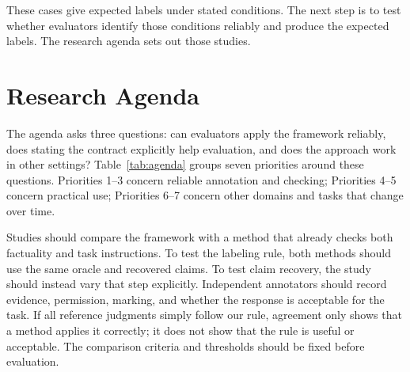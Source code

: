 \documentclass{clv2025}
\begin{document}
These cases give expected labels under stated conditions. The next step is
to test whether evaluators identify those conditions reliably and produce
the expected labels. The research agenda sets out those studies.


\section{Research Agenda}\label{sec:agenda}

The agenda asks three questions: can evaluators apply the framework reliably,
does stating the contract explicitly help evaluation, and does the approach
work in other settings? Table~\ref{tab:agenda} groups seven priorities around
these questions. Priorities 1--3 concern reliable annotation and checking;
Priorities 4--5 concern practical use; Priorities 6--7 concern other domains
and tasks that change over time.

Studies should compare the framework with a method that already checks both
factuality and task instructions. To test the labeling rule, both methods
should use the same oracle and recovered claims. To test claim recovery,
the study should instead vary that step explicitly. Independent annotators
should record evidence, permission, marking, and whether the response is
acceptable for the task. If all reference judgments simply follow our rule,
agreement only shows that a method applies it correctly; it does not show
that the rule is useful or acceptable. The comparison criteria and thresholds
should be fixed before evaluation.
\end{document}
